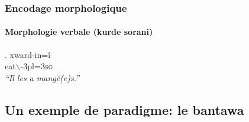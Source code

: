 \begin{frame}
\frametitle{Encodage morphologique}
\framesubtitle{Morphologie verbale (kurde sorani)}

\ex. xward-in\alert{=î} \\
eat$\backslash$\sii-{\sc 3pl}=\textsc{3sg}\\
{\em ``Il les a mangé(e)s.''}

\end{frame}

\iffalse
\subsection[Bantawa]{Un exemple de paradigme: le bantawa}


